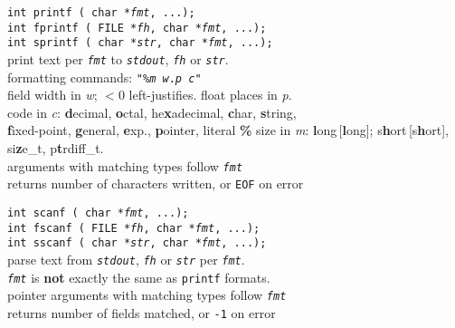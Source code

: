 \documentclass[8pt]{article}
\newcommand{\Cc}[1]{\texttt{#1}}
\newcommand{\ty}[1]{\textcolor{blue!80}{\texttt{#1}}} %
\newcommand{\kv}[1]{\textcolor{red!40!black}{\texttt{#1}}} %
\newcommand{\val}[1]{\texttt{#1}} %
\newcommand{\quo}[1]{\textcolor{violet!80!black}{\texttt{#1}}} %
\newcommand{\quot}[1]{\quo{"#1"}} %
\newcommand{\fn}[1]{\texttt{#1}} %
\newcommand{\var}[1]{\texttt{\textit{#1}}} %
\newcommand{\opt}[1]{\textrm{\textit{#1}}} %
\newcommand{\htab}{\hspace*{2em}} %
\begin{document}
\begin{multicols}{3}
\Cc{\ty{int} \fn{printf}\,(%
    \ty{char *}\var{fmt}, ...);} \\
\Cc{\ty{int} \fn{fprintf}\,(%
    \ty{FILE *}\var{fh}, %
    \ty{char *}\var{fmt}, ...);} \\
\Cc{\ty{int} \fn{sprintf}\,(%
    \ty{char *}\var{str}, %
    \ty{char *}\var{fmt}, ...);} \\
\htab print text per \var{fmt} to \var{stdout}, \var{fh} or \var{str}. \\
\htab formatting commands: \Cc{\quot{\%\opt{m}\,\opt{w}.\opt{p}\,\opt{c}}}\\
\htab field width in \opt{w}; $<0$ left-justifies. float places in \opt{p}. \\
\htab code in \opt{c}: \textbf{d}ecimal, \textbf{o}ctal,
    he\textbf{x}adecimal, \textbf{c}har, \textbf{s}tring, \\
\htab\htab \textbf{f}ixed-point, \textbf{g}eneral, \textbf{e}xp.,
    \textbf{p}ointer, literal \textbf{\%}
\htab size in \opt{m}: \textbf{l}ong\,[\textbf{l}ong]; s\textbf{h}ort\,[s\textbf{h}ort], si\textbf{z}e\_t, p\textbf{t}rdiff\_t. \\
\htab arguments with matching types follow \var{fmt} \\
\htab returns number of characters written, or \kv{EOF} on error

\Cc{\ty{int} \fn{scanf}\,(%
    \ty{char *}\var{fmt}, ...);} \\
\Cc{\ty{int} \fn{fscanf}\,(%
    \ty{FILE *}\var{fh}, %
    \ty{char *}\var{fmt}, ...);} \\
\Cc{\ty{int} \fn{sscanf}\,(%
    \ty{char *}\var{str}, %
    \ty{char *}\var{fmt}, ...);} \\
\htab parse text from \var{stdout}, \var{fh} or \var{str} per \var{fmt}. \\
\htab \var{fmt} is \textbf{not} exactly the same as \fn{printf} formats. \\
\htab pointer arguments with matching types follow \var{fmt} \\
\htab returns number of fields matched, or \val{-1} on error

\end{multicols}
\end{document}
